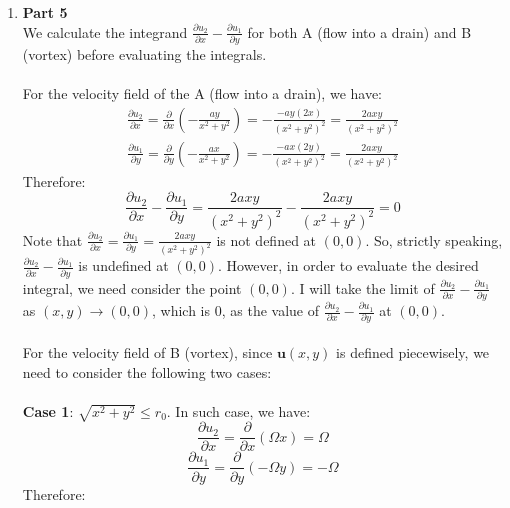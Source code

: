 \documentclass{article}
\begin{document}
\begin{enumerate}
\item \textbf{Part 5}\\
We calculate the integrand \(\frac{\partial u_2}{\partial x} - \frac{\partial u_1}{\partial y}\) for both A (flow into a drain) and B
(vortex) before evaluating the integrals. \\
\\
For the velocity field of the A (flow into a drain), we have:
\begin{align}
  \frac{\partial u_2}{\partial x}
  = \frac{\partial}{\partial x}\left(-\frac{ay}{x^2+y^2}\right)
  = -\frac{ - ay(2x)}{(x^2+y^2)^2} = \frac{2axy}{(x^2+y^2)^2 }
\end{align}
\begin{align}
  \frac{\partial u_1}{\partial y} = \frac{\partial}{\partial y}\left(-\frac{ax}{x^2+y^2}\right) = -\frac{- ax(2y)}{(x^2+y^2)^2} =\frac{2axy}{(x^2+y^2)^2}
\end{align}
Therefore:
\begin{equation}
  \frac{\partial u_2}{\partial x} - \frac{\partial u_1}{\partial y} = \frac{2axy}{(x^2+y^2)^2 } - \frac{2axy}{(x^2+y^2)^2 } = 0
\end{equation}
Note that \(\frac{\partial u_2}{\partial x} =\frac{\partial u_1}{\partial y}= \frac{2axy}{(x^2+y^2)^2 }\) is not defined at \((0,0)\).
So, strictly speaking, \(\frac{\partial u_2}{\partial x} - \frac{\partial u_1}{\partial y}\) is undefined at \((0,0)\).
However, in order to evaluate the desired integral, we need consider the point \((0,0)\).
I will take the limit of \(\frac{\partial u_2}{\partial x} - \frac{\partial u_1}{\partial y}\) as \((x,y)\to (0,0)\),
which is \(0\), as the value of \(\frac{\partial u_2}{\partial x} - \frac{\partial u_1}{\partial y}\) at \((0,0)\). \\
\\
For the velocity field of B (vortex), since \(\mathbf{u}(x,y)\) is defined piecewisely, we need to consider the following two cases:\\
\\
\textbf{Case 1}: \(\sqrt{x^2+y^2}\le r_0\). In such case, we have:
\begin{equation}
  \frac{\partial u_2}{\partial x} = \frac{\partial}{\partial x} (\Omega x) =\Omega
\end{equation}
\begin{equation}
  \frac{\partial u_1}{\partial y} = \frac{\partial}{\partial y}(-\Omega y ) = -\Omega
\end{equation}
Therefore:
\begin{equation}

\end{equation}
\end{enumerate}
\end{document}
